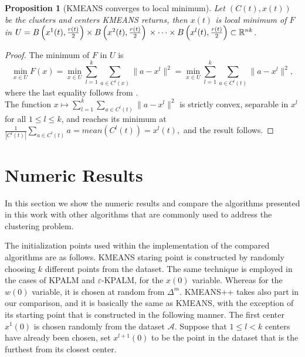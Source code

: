 \documentclass[11pt]{article}
\numberwithin{equation}{section}
\newtheorem{proposition}{Proposition}[section]
\begin{document}
\begin{proposition}[KMEANS converges to local minimum]
Let $(C(t), x(t))$ be the clusters and centers KMEANS returns, then $x(t)$ is local minimum of $F$ in $U = B\left( x^1(t),\frac{r(t)}{2}\right) \times  B\left( x^2(t),\frac{r(t)}{2}\right) \\ \times \cdots \times B\left( x^l(t),\frac{r(t)}{2} \right) \subset \mathbb{R}^{nk}$.
\end{proposition}

\begin{proof}
The minimum of $F$ in $U$ is
\begin{equation*}
\min\limits_{x \in U} F(x) = \min\limits_{x \in U} \sum\limits_{l=1}^{k} \sum\limits_{a \in C^l(x)} \|a - x^l \|^2 = \min\limits_{x \in U} \sum\limits_{l=1}^{k} \sum\limits_{a \in C^l(t)} \|a - x^l \|^2 ,
\end{equation*}
where the last equality follows from . \\
The function $x \mapsto \sum\limits_{l=1}^{k} \sum\limits_{a \in C^l(t)} \|a - x^l \|^2$ is strictly convex, separable in $x^l$ for all $1 \leq l \leq k$, and reaches its minimum at $\frac{1}{\left| C^l(t) \right|} \sum\limits_{a \in C^l(t)} a = mean(C^l(t)) = x^l(t),$ and the result follows.
\end{proof}

\newpage

\section{Numeric Results}
In this section we show the numeric results and compare the algorithms presented in this work with other algorithms that are commonly used to address the clustering problem.

The initialization points used within the implementation of the compared algorithms are as follows. KMEANS staring point is constructed by randomly choosing $k$ different points from the dataset. The same technique is employed in the cases of KPALM and $\varepsilon$-KPALM, for the $x(0)$ variable. Whereas for the $w(0)$ variable, it is chosen at random from $\Delta^m$. KMEANS++ takes also part in our comparison, and it is basically the same as KMEANS, with the exception of its starting point that is constructed in the following manner. The first center $x^1(0)$ is chosen randomly from the dataset $\mathcal{A}$. Suppose that $1 \leq l < k$ centers have already been chosen, set $x^{l+1}(0)$ to be the point in the dataset that is the furthest from its closest center.
\end{document}
